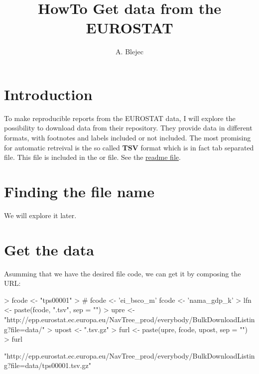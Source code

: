 \documentclass[a4paper,12pt]{article}\usepackage[]{graphicx}\usepackage[]{color}
\begin{document}
\title{HowTo Get data from the EUROSTAT}
\author{A. Blejec}
%

\maketitle
\tableofcontents



\section{Introduction}

To make reproducible reports from the EUROSTAT data, I will explore
the possibility to download data from their repository. They provide data in different formats, with footnotes and labels included or not included. The most promising for automatic retreival is the so called \textbf{TSV} format which is in fact tab separated file. This file is included in the  or  file. See the \href{http://epp.eurostat.ec.europa.eu/NavTree_prod/everybody/BulkDownloadListing?file=read_me.pdf}
{readme file}.

\section{Finding the file name}

We will explore it later.
\clearpage
\section{Get the data}

Asumming that we have the desired file code, we can get it by composing the
URL:

\begin{Schunk}
\begin{Sinput}
> fcode <- "tps00001"
> # fcode <- 'ei_bsco_m' fcode <- 'nama_gdp_k'
> lfn <- paste(fcode, ".tsv", sep = "")
> upre <- "http://epp.eurostat.ec.europa.eu/NavTree_prod/everybody/BulkDownloadListing?file=data/"
> upost <- ".tsv.gz"
> furl <- paste(upre, fcode, upost, sep = "")
> furl
\end{Sinput}
\begin{Soutput}
[1] "http://epp.eurostat.ec.europa.eu/NavTree_prod/everybody/BulkDownloadListing?file=data/tps00001.tsv.gz"
\end{Soutput}
\end{Schunk}
\end{document}
